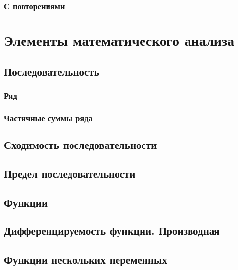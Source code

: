 \documentclass[
  letterpaper,
]{scrbook}
\theoremstyle{definition}
\theoremstyle{remark}
\begin{document}
\subsection{С
повторениями}\label{ux441-ux43fux43eux432ux442ux43eux440ux435ux43dux438ux44fux43cux438-1}


\chapter{Элементы математического анализа}\label{math-analysis}

\section{Последовательность}\label{math-analysis-sequence}

\subsection{Ряд}\label{math-analysis-sequence-series}

\subsection{Частичные суммы
ряда}\label{math-analysis-sequence-partialsums}

\section{Сходимость последовательности}\label{math-analysis-convergence}

\section{Предел последовательности}\label{math-analysis-limit}

\section{Функции}\label{math-analysis-functions}

\section{Дифференцируемость функции.
Производная}\label{math-analysis-deriv}

\section{Функции нескольких
переменных}\label{math-analysis-multivariate}
\end{document}
